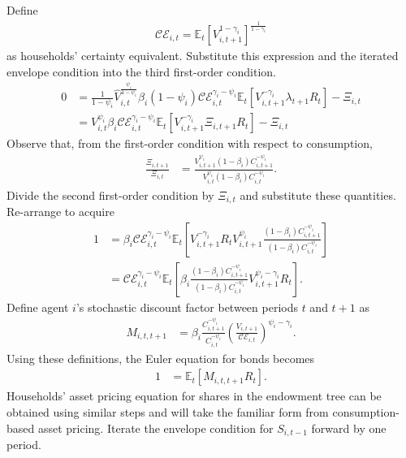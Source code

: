 \documentclass[12 pt, oneside]{article}
\theoremstyle{definition}
\theoremstyle{definition}
\theoremstyle{definition}
\newcommand{\E}{\mathbb{E}}
\newcommand{\calC}{\mathcal{C}}
\newcommand{\calE}{\mathcal{E}}
\begin{document}
Define
\begin{align}\label{eq:certainty equivalent definition}
\calC\calE_{i, t} = \E_t[V_{i, t + 1}^{1 - \gamma_i}]^{\frac{1}{1 - \gamma_i}}
\end{align}
as households' certainty equivalent. Substitute this expression and the iterated envelope condition into the third first-order condition.
\begin{align*}
  0 & = \frac{1}{1 - \psi_i}\hat{V}_{i, t}^{\frac{\psi_i}{1 - \psi_i}}\beta_i(1 - \psi_i)\calC\calE_{i, t}^{\gamma_i - \psi_i}\E_t\left[V_{i, t + 1}^{-\gamma_i}\lambda_{t + 1}R_t\right] - \Xi_{i, t}\\
    & = V_{i, t}^{\psi_i}\beta_i\calC\calE_{i, t}^{\gamma_i - \psi_i}\E_t\left[V_{i, t + 1}^{-\gamma_i}\Xi_{i, t + 1}R_t\right] - \Xi_{i, t}
\end{align*}
Observe that, from the first-order condition with respect to consumption,
\begin{align*}
  \frac{\Xi_{i, t + 1}}{\Xi_{i, t}} & = \frac{V_{i, t + 1}^{\psi_i} (1 - \beta_i)C_{i, t + 1}^{-\psi_i}}{V_{i, t}^{\psi_i} (1 - \beta_i)C_{i, t}^{-\psi_i}}.
\end{align*}
Divide the second first-order condition by $\Xi_{i, t}$ and substitute these quantities. Re-arrange to acquire
\begin{align*}
  1 & = \beta_i\calC\calE_{i, t}^{\gamma_i - \psi_i}\E_t\left[V_{i, t + 1}^{-\gamma_i} R_t V_{i, t + 1}^{\psi_i} \frac{(1 - \beta_i)C_{i, t + 1}^{-\psi_i}}{(1 - \beta_i)C_{i, t}^{-\psi_i}} \right]\\
    & = \calC\calE_{i, t}^{\gamma_i - \psi_i}\E_t\left[\beta_i\frac{(1 - \beta_i)C_{i, t + 1}^{-\psi_i}}{(1 - \beta_i)C_{i, t}^{-\psi_i}}V_{i, t + 1}^{\psi_i - \gamma_i} R_t\right].
\end{align*}
Define agent $i$'s stochastic discount factor between periods $t$ and $t + 1$ as
\begin{align}\label{eq:sdf}
  M_{i, t, t + 1} & = \beta_i \frac{C_{i, t + 1}^{-\psi_i}}{C_{i, t}^{-\psi_i}}\left(\frac{V_{i, t + 1}}{\calC\calE_{i, t}}\right)^{\psi_i - \gamma_i}.
\end{align}
Using these definitions, the Euler equation for bonds becomes
\begin{align}
  1 & = \E_t\left[M_{i, t, t + 1}R_t\right].
\end{align}
Households' asset pricing equation for shares in the endowment tree can be obtained using similar steps and will take the familiar form from consumption-based asset pricing. Iterate the envelope condition for $S_{i, t - 1}$ forward by one period.
\end{document}
